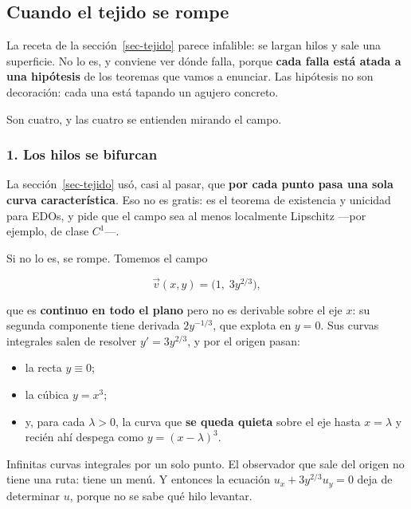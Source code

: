 \documentclass[
  spanish,
  a4paper,
]{scrbook}
\providecommand{\tightlist}{%
  \setlength{\itemsep}{0pt}\setlength{\parskip}{0pt}}
\theoremstyle{definition}
\theoremstyle{plain}
\theoremstyle{definition}
\theoremstyle{plain}
\theoremstyle{definition}
\theoremstyle{remark}
\begin{document}
\subsection{Cuando el tejido se rompe}\label{sec-patologias}

La receta de la sección~\ref{sec-tejido} parece infalible: se largan
hilos y sale una superficie. No lo es, y conviene ver dónde falla,
porque \textbf{cada falla está atada a una hipótesis} de los teoremas
que vamos a enunciar. Las hipótesis no son decoración: cada una está
tapando un agujero concreto.

Son cuatro, y las cuatro se entienden mirando el campo.

\subsubsection{1. Los hilos se
bifurcan}\label{sec-patologia-bifurcacion}

La sección~\ref{sec-tejido} usó, casi al pasar, que \textbf{por cada
punto pasa una sola curva característica}. Eso no es gratis: es el
teorema de existencia y unicidad para EDOs, y pide que el campo sea al
menos localmente Lipschitz ---por ejemplo, de clase \(C^1\)---.

Si no lo es, se rompe. Tomemos el campo

\[
\vec v(x,y) = \big(1,\; 3y^{2/3}\big) ,
\]

que es \textbf{continuo en todo el plano} pero no es derivable sobre el
eje \(x\): su segunda componente tiene derivada \(2y^{-1/3}\), que
explota en \(y=0\). Sus curvas integrales salen de resolver
\(y' = 3y^{2/3}\), y por el origen pasan:

\begin{itemize}
\tightlist
\item
  la recta \(y \equiv 0\);
\item
  la cúbica \(y = x^3\);
\item
  y, para cada \(\lambda > 0\), la curva que \textbf{se queda quieta}
  sobre el eje hasta \(x=\lambda\) y recién ahí despega como
  \(y = (x-\lambda)^3\).
\end{itemize}

Infinitas curvas integrales por un solo punto. El observador que sale
del origen no tiene una ruta: tiene un menú. Y entonces la ecuación
\(u_x + 3y^{2/3}u_y = 0\) deja de determinar \(u\), porque no se sabe
qué hilo levantar.
\end{document}
